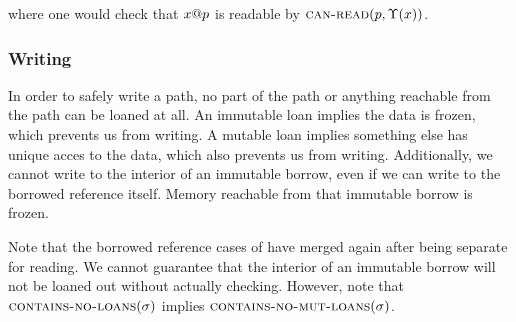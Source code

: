 

where one would check that ${x}@{p}$ is readable by $\textsc{can-read}({p},{\Upsilon(x)})$.

\subsubsection*{Writing}
In order to safely write a path, no part of the path or anything reachable from the path
can be loaned at all. An immutable loan implies the data is frozen, 
which prevents us from writing. A mutable loan implies something else has unique acces
to the data, which also prevents us from writing.
Additionally, we cannot write to the interior of an immutable borrow, even if we can
write to the borrowed reference itself. Memory reachable from that immutable borrow
is frozen.
\newline

\fbox{$\cnl{\gs}$}


Note that the borrowed reference cases of have merged again after being separate for reading.
We cannot guarantee that the interior of an immutable borrow will not be loaned out without
actually checking. However, note that $\cnl{\gs}$ implies $\textsc{contains-no-mut-loans}({\sigma})$.
\newline



